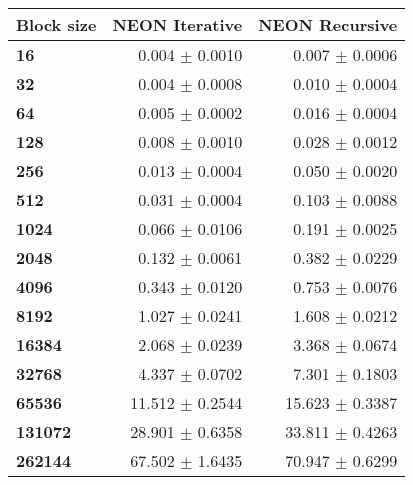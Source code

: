 \begin{tabular}{lrr}\toprule
\textbf{Block size}  & \textbf{NEON Iterative} & \textbf{NEON Recursive} \\\midrule
\textbf{16}  & 0.004 $\pm$ 0.0010 & 0.007 $\pm$ 0.0006 \\
\textbf{32}  & 0.004 $\pm$ 0.0008 & 0.010 $\pm$ 0.0004 \\
\textbf{64}  & 0.005 $\pm$ 0.0002 & 0.016 $\pm$ 0.0004 \\
\textbf{128}  & 0.008 $\pm$ 0.0010 & 0.028 $\pm$ 0.0012 \\
\textbf{256}  & 0.013 $\pm$ 0.0004 & 0.050 $\pm$ 0.0020 \\
\textbf{512}  & 0.031 $\pm$ 0.0004 & 0.103 $\pm$ 0.0088 \\
\textbf{1024}  & 0.066 $\pm$ 0.0106 & 0.191 $\pm$ 0.0025 \\
\textbf{2048}  & 0.132 $\pm$ 0.0061 & 0.382 $\pm$ 0.0229 \\
\textbf{4096}  & 0.343 $\pm$ 0.0120 & 0.753 $\pm$ 0.0076 \\
\textbf{8192}  & 1.027 $\pm$ 0.0241 & 1.608 $\pm$ 0.0212 \\
\textbf{16384}  & 2.068 $\pm$ 0.0239 & 3.368 $\pm$ 0.0674 \\
\textbf{32768}  & 4.337 $\pm$ 0.0702 & 7.301 $\pm$ 0.1803 \\
\textbf{65536}  & 11.512 $\pm$ 0.2544 & 15.623 $\pm$ 0.3387 \\
\textbf{131072}  & 28.901 $\pm$ 0.6358 & 33.811 $\pm$ 0.4263 \\
\textbf{262144} & 67.502 $\pm$ 1.6435 & 70.947 $\pm$ 0.6299 \\
\bottomrule
\end{tabular}
